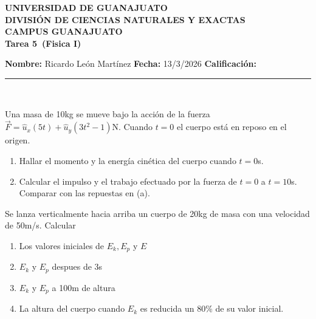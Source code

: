 \documentclass[12pt,a4paper]{article}
\newcommand{\alumno}{Ricardo León Martínez}
\newcommand{\materia}{Fisica I}
\newcommand{\tarea}{Tarea 5}
\newcommand{\fecha}{13/3/2026}
\begin{document}
    \begin{center}
    {\large\textbf{UNIVERSIDAD DE GUANAJUATO}}\\[0.3cm]
    {\normalsize\textbf{DIVISIÓN DE CIENCIAS NATURALES Y EXACTAS}}\\
    {\normalsize\textbf{CAMPUS GUANAJUATO}}\\[1cm]

    {\Large\textbf{\tarea\ (\materia)}}\\[1cm]
    \end{center}

    \textbf{Nombre:} \alumno \hfill 
    \textbf{Fecha:} \fecha \hfill 
    \textbf{Calificación:} \rule{3cm}{0.4pt} \\[0.3cm]

    \begin{problema}
        Una masa de 10kg se mueve bajo la acción de la fuerza $\vec{F}=\hat{u}_{x}(5t)+\hat{u}_{y}(3t^{2}-1)$N.
        Cuando $t=0$ el cuerpo está en reposo en el origen.
        \begin{enumerate}
            \item[(a)] Hallar el momento y la energía cinética del cuerpo cuando $t=0$s.
            \item[(b)] Calcular el impulso y el trabajo efectuado por la fuerza de $t=0$ a $t=10$s.
            Comparar con las repuestas en (a). 
        \end{enumerate}
    \end{problema}

    \begin{problema}
        Se lanza verticalmente hacia arriba un cuerpo de 20kg de masa con una velocidad de
        50m/s. Calcular
        \begin{enumerate}
            \item[(a)] Los valores iniciales de $E_{k},E_{p}$ y $E$
            \item[(b)] $E_{k}$ y $E_{p}$ despues de 3s
            \item[(c)] $E_{k}$ y $E_{p}$ a 100m de altura
            \item[(d)] La altura del cuerpo cuando $E_{k}$ es reducida un 80\% de su valor inicial.   
        \end{enumerate}
    \end{problema}
\end{document}
